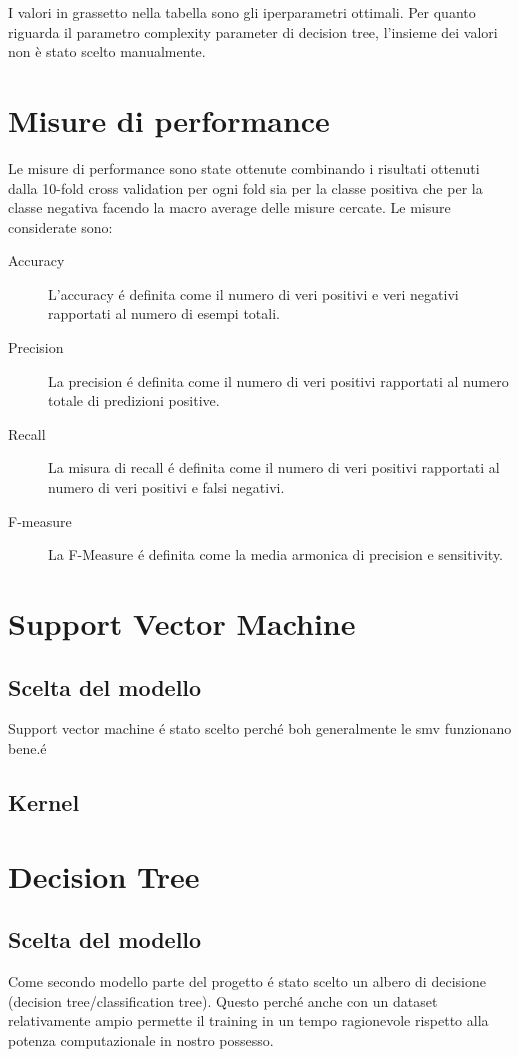 I valori in grassetto nella tabella sono gli iperparametri ottimali.
Per quanto riguarda il parametro complexity parameter di decision
tree, l'insieme dei valori non è stato scelto manualmente.


\section{Misure di performance}
Le misure di performance sono state ottenute combinando i risultati
ottenuti dalla 10-fold cross validation per ogni fold sia per la
classe positiva che per la classe negativa facendo la macro average
delle misure cercate. Le misure considerate sono:

\begin{description}
\item [Accuracy] L'accuracy é definita come il numero di veri positivi
  e veri negativi rapportati al numero di esempi totali.

\item [Precision] La precision é definita come il numero di veri
  positivi rapportati al numero totale di predizioni positive.

\item [Recall] La misura di recall é definita come il numero di veri
  positivi rapportati al numero di veri positivi e falsi negativi.

\item [F-measure] La F-Measure é definita come la media armonica di
  precision e sensitivity.
\end{description}


\section{Support Vector Machine}
\subsection{Scelta del modello}
Support vector machine é stato scelto perché boh generalmente le smv
funzionano bene.é

\subsection{Kernel}

\section{Decision Tree} \subsection{Scelta del modello} Come secondo
modello parte del progetto é stato scelto un albero di decisione
(decision tree/classification tree). Questo perché anche con un
dataset relativamente ampio permette il training in un tempo
ragionevole rispetto alla potenza computazionale in nostro possesso.

